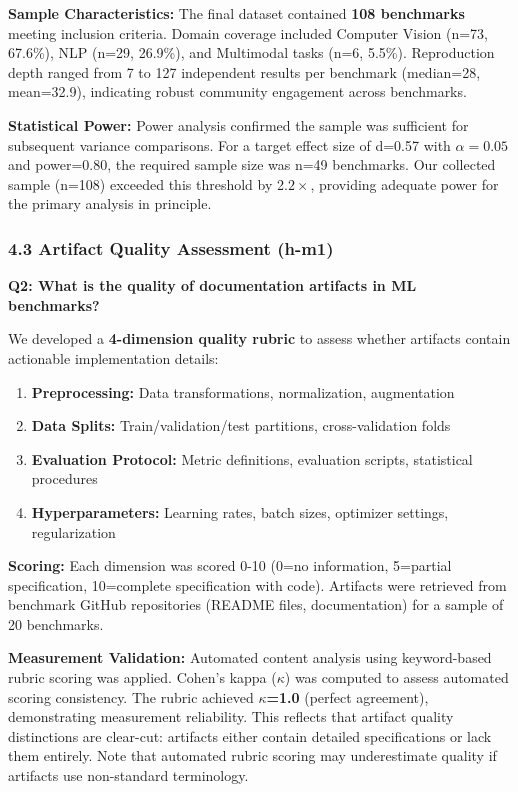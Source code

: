 \textbf{Sample Characteristics:} The final dataset contained \textbf{108 benchmarks} meeting inclusion criteria. Domain coverage included Computer Vision (n=73, 67.6\%), NLP (n=29, 26.9\%), and Multimodal tasks (n=6, 5.5\%). Reproduction depth ranged from 7 to 127 independent results per benchmark (median=28, mean=32.9), indicating robust community engagement across benchmarks.

\textbf{Statistical Power:} Power analysis confirmed the sample was sufficient for subsequent variance comparisons. For a target effect size of d=0.57 with $\alpha =0.05$ and power=0.80, the required sample size was n=49 benchmarks. Our collected sample (n=108) exceeded this threshold by 2.$2\times$, providing adequate power for the primary analysis in principle.

\subsubsection{4.3 Artifact Quality Assessment (h-m1)}

\textbf{Q2: What is the quality of documentation artifacts in ML benchmarks?}

We developed a \textbf{4-dimension quality rubric} to assess whether artifacts contain actionable implementation details:
\begin{enumerate}
\item \textbf{Preprocessing:} Data transformations, normalization, augmentation
\item \textbf{Data Splits:} Train/validation/test partitions, cross-validation folds
\item \textbf{Evaluation Protocol:} Metric definitions, evaluation scripts, statistical procedures
\item \textbf{Hyperparameters:} Learning rates, batch sizes, optimizer settings, regularization
\end{enumerate}

\textbf{Scoring:} Each dimension was scored 0-10 (0=no information, 5=partial specification, 10=complete specification with code). Artifacts were retrieved from benchmark GitHub repositories (README files, documentation) for a sample of 20 benchmarks.

\textbf{Measurement Validation:} Automated content analysis using keyword-based rubric scoring was applied. Cohen's kappa ($\kappa$) was computed to assess automated scoring consistency. The rubric achieved \textbf{$\kappa$=1.0} (perfect agreement), demonstrating measurement reliability. This reflects that artifact quality distinctions are clear-cut: artifacts either contain detailed specifications or lack them entirely. Note that automated rubric scoring may underestimate quality if artifacts use non-standard terminology.

